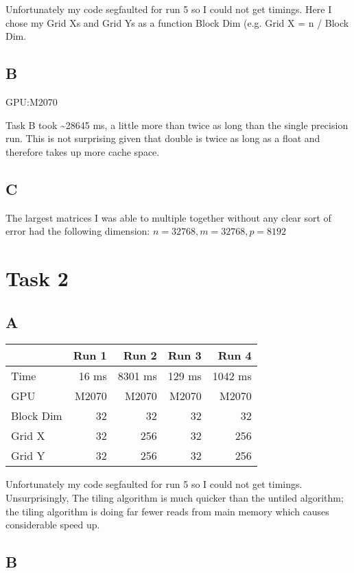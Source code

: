 \documentclass[11pt]{article}
\begin{document}
Unfortunately my code segfaulted for run 5 so I could not get timings. Here I chose my Grid Xs and Grid Ys as a function Block Dim (e.g. Grid X = n / Block Dim. 

\subsection{B}
\label{sec:org498a1a8}

GPU:M2070

Task B took \textasciitilde{}28645 ms, a little more than twice as long than the single precision run. This is not surprising given that double is twice as long as a float and therefore takes up more cache space.

\subsection{C}
\label{sec:org83cb2c0}
The largest matrices I was able to multiple together without any clear sort of error had the following dimension: \(n = 32768, m = 32768, p = 8192\)

\section{Task 2}
\label{sec:org9cb9378}

\subsection{A}
\label{sec:orgd3b76bd}
\begin{center}
\begin{tabular}{lrrrr}
 & Run 1 & Run 2 & Run 3 & Run 4\\
\hline
Time & 16 ms & 8301 ms & 129 ms & 1042 ms\\
GPU & M2070 & M2070 & M2070 & M2070\\
Block Dim & 32 & 32 & 32 & 32\\
Grid X & 32 & 256 & 32 & 256\\
Grid Y & 32 & 256 & 32 & 256\\
\end{tabular}
\end{center}

Unfortunately my code segfaulted for run 5 so I could not get timings. Unsurprisingly, The tiling algorithm is much quicker than the untiled algorithm; the tiling algorithm is doing far fewer reads from main memory which causes considerable speed up.
\subsection{B}
\label{sec:orgd4ee2c2}
\end{document}
